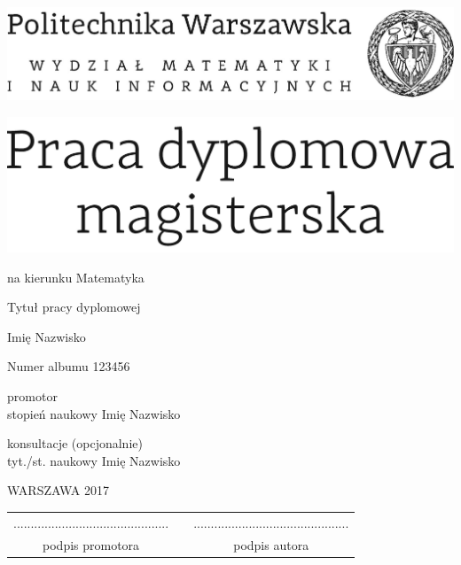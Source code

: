\documentclass[12pt,twoside,a4paper]{article}
\newcommand{\discipline}{Matematyka}
\renewcommand{\title}{Tytuł pracy dyplomowej}
\renewcommand{\author}{Imię Nazwisko}
\newcommand{\supervisor}{stopień naukowy Imię Nazwisko}
\newcommand{\album}{123456}
\renewcommand{\year}{2017}
\begin{document}
\pagestyle{empty}

\begin{center}
\includegraphics[scale=1.]{politechnika} 
\vspace{70pt}


\includegraphics[scale=1.]{praca_mgr} %

{ \arial na kierunku \discipline

\vspace{40pt}
{\arial \large \title}

\vspace{50pt}

{\arial \huge \author}

\vspace{5pt}

Numer albumu \album

\vspace{40pt}

promotor \\
{\arial \supervisor}

\vspace{15pt}
 
konsultacje (opcjonalnie)  \\
{\arial tyt./st. naukowy Imię Nazwisko }

 \vfill
WARSZAWA \year \\
}
\end{center}


\newpage
\null

\vfill

\begin{center}
\begin{tabular}[t]{ccc}
............................................. & \hspace*{100pt} & .............................................\\
podpis promotora & \hspace*{100pt} & podpis autora
\end{tabular}
\end{center}
\end{document}

